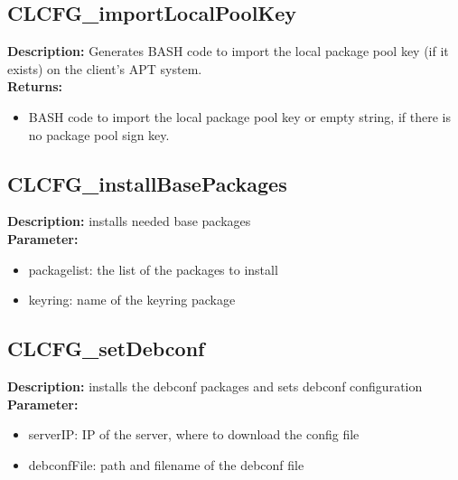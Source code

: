 \subsection{CLCFG\_importLocalPoolKey}
\textbf{Description:} Generates BASH code to import the local package pool key (if it exists) on the client's APT system.\\
\textbf{Returns:}
\begin{itemize}
\item BASH code to import the local package pool key or empty string, if there is no package pool sign key.
\end{itemize}

\subsection{CLCFG\_installBasePackages}
\textbf{Description:} installs needed base packages\\
\textbf{Parameter:}
\begin{itemize}
\item packagelist: the list of the packages to install
\item keyring: name of the keyring package
\end{itemize}

\subsection{CLCFG\_setDebconf}
\textbf{Description:} installs the debconf packages and sets debconf configuration\\
\textbf{Parameter:}
\begin{itemize}
\item serverIP: IP of the server, where to download the config file
\item debconfFile: path and filename of the debconf file
\end{itemize}


